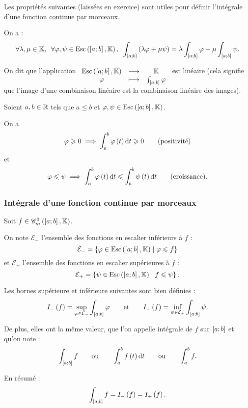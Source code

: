 \begin{rem}
Les propriétés suivantes (laissées en exercice) sont utiles pour définir l'intégrale d'une fonction continue par morceaux.
\end{rem}

\begin{prop}
On a : \[\quantifs{\forall\lambda,\mu\in\K;\forall\phi,\psi\in\Esc}\int_{\intervii{a}{b}}\paren{\lambda\phi+\mu\psi}=\lambda\int_{\intervii{a}{b}}\phi+\mu\int_{\intervii{a}{b}}\psi.\]

On dit que l'application \(\fonctionlambda{\Esc}{\K}{\phi}{\int_{\intervii{a}{b}}\phi}\) est linéaire (cela signifie que l'image d'une combinaison linéaire est la combinaison linéaire des images).
\end{prop}

\begin{prop}
Soient \(a,b\in\mathbb{R}\) tels que \(a\leq b\) et \(\phi,\psi\in\Esc\).

On a \[\phi\geq0\imp\int_a^b\phi\paren{t}\odif{t}\geq0\qquad\text{(positivité)}\] et \[\phi\leq\psi\imp\int_a^b\phi\paren{t}\odif{t}\leq\int_a^b\psi\paren{t}\odif{t}\qquad\text{(croissance).}\]
\end{prop}

\subsubsection{Intégrale d'une fonction continue par morceaux}

\begin{deftheo}
\newcommand{\Em}{\mathcal{E}_-}
\newcommand{\Ep}{\mathcal{E}_+}
Soit \(f\in\contm\).

On note \(\Em\) l'ensemble des fonctions en escalier inférieurs à \(f\) : \[\Em=\accol{\phi\in\Esc\tq\phi\leq f}\] et \(\Ep\) l'ensemble des fonctions en escalier supérieures à \(f\) : \[\Ep=\accol{\psi\in\Esc\tq f\leq\psi}.\]

Les bornes supérieure et inférieure suivantes sont bien définies : \[I_-\paren{f}=\sup_{\phi\in\Em}\int_{\intervii{a}{b}}\phi\qquad\text{et}\qquad I_+\paren{f}=\inf_{\psi\in\Ep}\int_{\intervii{a}{b}}\psi.\]

De plus, elles ont la même valeur, que l'on appelle intégrale de \(f\) sur \(\left[a;b\right]\) et qu'on note : \[\int_{\intervii{a}{b}}f\qquad\text{ou}\qquad\int_a^bf\paren{t}\odif{t}\qquad\text{ou}\qquad\int_a^bf.\]

En résumé : \[\int_{\left[a;b\right]}f=I_-\left(f\right)=I_+\left(f\right).\]
\end{deftheo}

